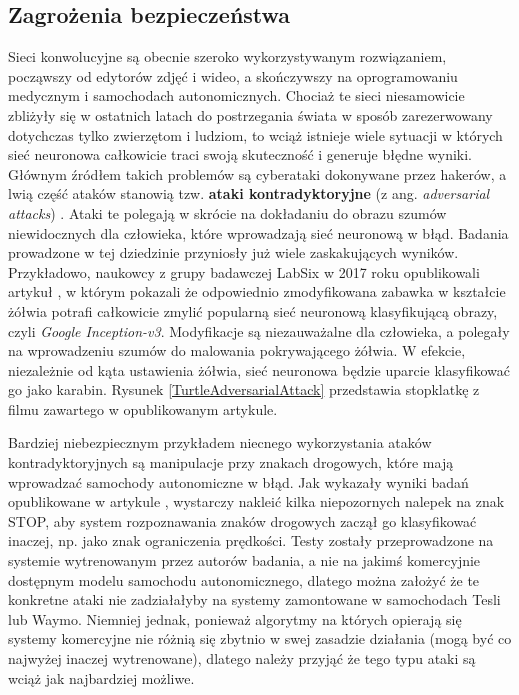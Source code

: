 \subsection{Zagrożenia bezpieczeństwa}
Sieci konwolucyjne są obecnie szeroko wykorzystywanym rozwiązaniem, począwszy od edytorów zdjęć i wideo, a skończywszy na oprogramowaniu medycznym i samochodach autonomicznych. Chociaż te sieci niesamowicie zbliżyły się w ostatnich latach do postrzegania świata w sposób zarezerwowany dotychczas tylko zwierzętom i ludziom, to wciąż istnieje wiele sytuacji w których sieć neuronowa całkowicie traci swoją skuteczność i generuje błędne wyniki. Głównym źródłem takich problemów są cyberataki dokonywane przez hakerów, a lwią część ataków stanowią tzw. \textbf{ataki kontradyktoryjne} (z ang. \textit{adversarial attacks}) \cite{dickson:adversarialMl}. Ataki te polegają w skrócie na dokładaniu do obrazu szumów niewidocznych dla człowieka, które wprowadzają sieć neuronową w błąd. Badania prowadzone w tej dziedzinie przyniosły już wiele zaskakujących wyników. Przykładowo, naukowcy z grupy badawczej LabSix w 2017 roku opublikowali artykuł \cite{labsix:foolingNNs}, w którym pokazali że odpowiednio zmodyfikowana zabawka w kształcie żółwia potrafi całkowicie zmylić popularną sieć neuronową klasyfikującą obrazy, czyli \textit{Google Inception-v3}. Modyfikacje są niezauważalne dla człowieka, a polegały na wprowadzeniu szumów do malowania pokrywającego żółwia. W efekcie, niezależnie od kąta ustawienia żółwia, sieć neuronowa będzie uparcie klasyfikować go jako karabin. Rysunek \ref{TurtleAdversarialAttack} przedstawia stopklatkę z filmu zawartego w opublikowanym artykule.

Bardziej niebezpiecznym przykładem niecnego wykorzystania ataków kontradyktoryjnych są manipulacje przy znakach drogowych, które mają wprowadzać samochody autonomiczne w błąd. Jak wykazały wyniki badań opublikowane w artykule \cite{adversarial:roadSignAttacks}, wystarczy nakleić kilka niepozornych nalepek na znak STOP, aby system rozpoznawania znaków drogowych zaczął go klasyfikować inaczej, np. jako znak ograniczenia prędkości. Testy zostały przeprowadzone na systemie wytrenowanym przez autorów badania, a nie na jakimś komercyjnie dostępnym modelu samochodu autonomicznego, dlatego można założyć że te konkretne ataki nie zadziałałyby na systemy zamontowane w samochodach Tesli lub Waymo. Niemniej jednak, ponieważ algorytmy na których opierają się systemy komercyjne nie różnią się zbytnio w swej zasadzie działania (mogą być co najwyżej inaczej wytrenowane), dlatego należy przyjąć że tego typu ataki są wciąż jak najbardziej możliwe. \\

